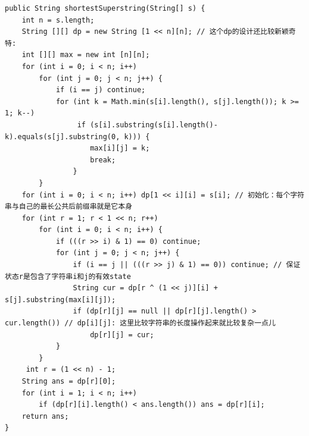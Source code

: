 \documentclass[9pt, b5paaper]{book}
\begin{document}
\begin{verbatim}
public String shortestSuperstring(String[] s) {
    int n = s.length;
    String [][] dp = new String [1 << n][n]; // 这个dp的设计还比较新颖奇特:
    int [][] max = new int [n][n];
    for (int i = 0; i < n; i++) 
        for (int j = 0; j < n; j++) {
            if (i == j) continue;
            for (int k = Math.min(s[i].length(), s[j].length()); k >= 1; k--) 
                 if (s[i].substring(s[i].length()-k).equals(s[j].substring(0, k))) {
                    max[i][j] = k;
                    break;
                }
        }
    for (int i = 0; i < n; i++) dp[1 << i][i] = s[i]; // 初始化：每个字符串与自己的最长公共后前缀串就是它本身
    for (int r = 1; r < 1 << n; r++) 
        for (int i = 0; i < n; i++) {
            if (((r >> i) & 1) == 0) continue;
            for (int j = 0; j < n; j++) {
                if (i == j || (((r >> j) & 1) == 0)) continue; // 保证状态r是包含了字符串i和j的有效state
                String cur = dp[r ^ (1 << j)][i] + s[j].substring(max[i][j]);
                if (dp[r][j] == null || dp[r][j].length() > cur.length()) // dp[i][j]: 这里比较字符串的长度操作起来就比较复杂一点儿
                    dp[r][j] = cur;
            }
        }
     int r = (1 << n) - 1;
    String ans = dp[r][0];
    for (int i = 1; i < n; i++) 
        if (dp[r][i].length() < ans.length()) ans = dp[r][i];
    return ans;
}
\end{verbatim}
\end{document}

